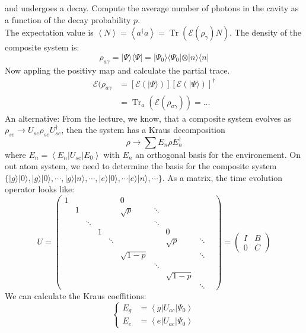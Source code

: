 \documentclass[12pt]{book}
\theoremstyle{definition}
\newcommand{\scalar}[1]{\left\langle {#1}\right\rangle}
\let\oldsum\sum
\renewcommand{\sum}[2]{\oldsum\limits_{#1}^{#2}}
\renewcommand{\to}{\longrightarrow}
\newcommand{\bra}[1]{\langle {#1} \vert}
\newcommand{\ket}[1]{\vert {#1} \rangle}
\DeclareMathOperator{\tr}{Tr}
\begin{document}
and undergoes a decay. Compute the average number of photons in the cavity as a function of the decay probability $p$. \\
The expectation value is $\scalar{N} = \scalar{a^\dagger a} = \tr(\mathcal E(\rho_{\gamma}) N)$. The density of the composite system is:
\begin{equation}
  \rho_{a\gamma} = \ket{\Psi}\bra{\Psi} = \ket{\Psi_0} \bra{\Psi_0} \otimes \ket{n}\bra{n}
\end{equation}
Now appling the positivy map and calculate the partial trace.
\begin{align*}
  \mathcal E(\rho_{a\gamma} & = \left[\mathcal E (\ket{\Psi})\right]\left[\mathcal E (\ket{\Psi})\right]^\dagger \\
  & = \tr_a(\mathcal E(\rho_{a\gamma})) = ...
\end{align*}
An alternative: From the lecture, we know, that a composite system evolves as $\rho_{se} \to U_{se} \rho_{se} U_{se}^\dagger$, then the system has a Kraus decomposition
\begin{equation*}
  \rho \to \oldsum E_n \rho E_n^\dagger
\end{equation*}
where $E_n = \scalar{E_n \vert U_{se} \vert E_0}$ with $E_n$ an orthogonal basis for the environement. On out atom system, we need to determine the basis for the composite system $\{\ket{g} \ket{0}, \ket{g}\ket{0}, \cdots, \ket{g} \ket{n}, \cdots, \ket{e}\ket{0}, \cdots \ket{e}\ket{n}, \cdots\}$.
As a matrix, the time evolution operator looks like:
\begin{equation*}
  U =
  \begin{pmatrix}
    1 &&&&& 0 &&&& \\
    & 1 & &&& \sqrt{p} & \ddots \\
    && \ddots &&&& \ddots \\
    &&& 1 &&&& 0 \\
    &&&& \ddots &&& \sqrt{p} & \ddots \\
    &&&&& \sqrt{1 - p} &&& \ddots \\
    &&&&&& \ddots  \\
    &&&&&&& \sqrt{1 - p} \\
    &&&&&&&& \ddots
  \end{pmatrix} =
  \begin{pmatrix}
    I & B \\
    0 & C
  \end{pmatrix}
\end{equation*}
We can calculate the Kraus coeffitions:
\begin{equation*}
  \begin{cases}
    E_g & = \scalar{g \vert U_{ac} \vert \Psi_0} \\
    E_e & = \scalar{e \vert U_{ac} \vert \Psi_0}
  \end{cases}
\end{equation*}
\end{document}
